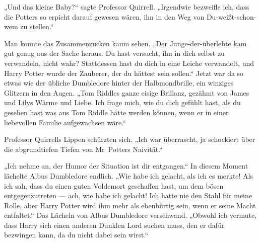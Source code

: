 „Und das kleine Baby?“ sagte Professor Quirrell.
„Irgendwie bezweifle ich, dass die Potters so erpicht darauf gewesen wären, ihn in den Weg von Du-weißt-schon-wem zu stellen.“

Man konnte das Zusammenzucken kaum sehen.
„Der Junge-der-überlebte kam gut genug aus der Sache heraus. Du hast versucht, ihn in dich selbst zu verwandeln, nicht wahr? Stattdessen hast du dich in eine Leiche verwandelt, und Harry Potter wurde der Zauberer, der du hättest sein sollen.“
Jetzt war da so etwas wie der übliche Dumbledore hinter der Halbmondbrille, ein winziges Glitzern in den Augen.
„Tom Riddles ganze eisige Brillanz, gezähmt von James und Lilys Wärme und Liebe. Ich frage mich, wie du dich gefühlt hast, als du gesehen hast was aus Tom Riddle hätte werden können, wenn er in einer liebevollen Familie aufgewachsen wäre.“

Professor Quirrells Lippen schürzten sich.
„Ich war überrascht, ja schockiert über die abgrundtiefen Tiefen von Mr~Potters Naivität.“

„Ich nehme an, der Humor der Situation ist dir entgangen.“
In diesem Moment lächelte Albus Dumbledore endlich.
„Wie habe ich gelacht, als ich es merkte! Als ich sah, dass du einen guten Voldemort geschaffen hast, um dem bösen entgegenzutreten — ach, wie habe ich gelacht! Ich hatte nie den Stahl für meine Rolle, aber Harry Potter wird ihm mehr als ebenbürtig sein, wenn er seine Macht entfaltet.“
Das Lächeln von Albus Dumbledore verschwand.
„Obwohl ich vermute, dass Harry sich einen anderen Dunklen Lord suchen muss, den er dafür bezwingen kann, da du nicht dabei sein wirst.“

